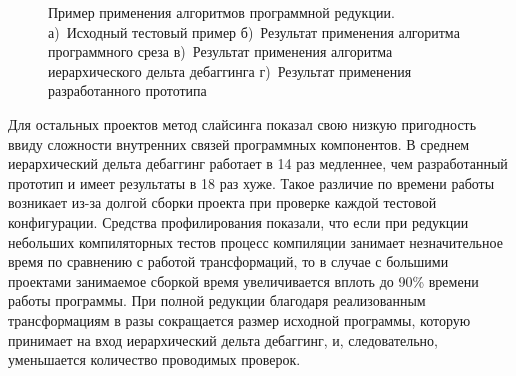 \begin{figure}


\caption{\label{test:compare}Пример применения алгоритмов программной редукции. а)~Исходный тестовый пример б)~Результат применения алгоритма программного среза в)~Результат применения алгоритма иерархического дельта дебаггинга г)~Результат применения разработанного прототипа}
\end{figure}
Для остальных проектов метод слайсинга показал свою низкую пригодность ввиду сложности внутренних связей программных компонентов. В среднем иерархический дельта дебаггинг работает в 14 раз медленнее, чем разработанный прототип и имеет результаты в 18 раз хуже. Такое различие по времени работы возникает из-за долгой сборки проекта при проверке каждой тестовой конфигурации. Средства профилирования показали, что если при редукции небольших компиляторных тестов процесс компиляции занимает незначительное время по сравнению с работой трансформаций, то в случае с большими проектами занимаемое сборкой время увеличивается вплоть до 90\% времени работы программы. При полной редукции благодаря реализованным трансформациям в разы сокращается размер исходной программы, которую принимает на вход иерархический дельта дебаггинг, и, следовательно, уменьшается количество проводимых проверок. 

